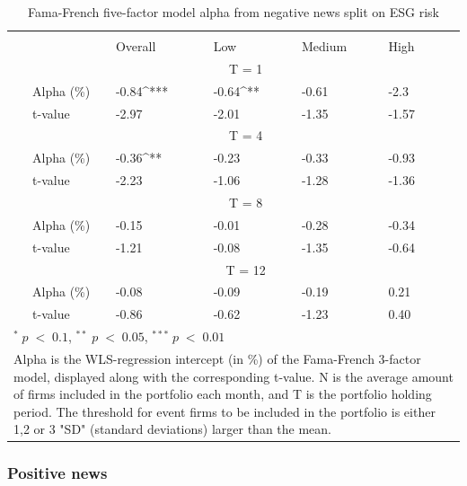 \setlength{\tabcolsep}{15pt}
\begin{table}[H]
\small
\centering
\caption{Fama-French five-factor model alpha from negative news split on ESG risk} 
\begin{tabular}{llllllc}
\hline \hline \\ 
 &     & Overall &    Low  &  Medium  &  High &  \\    \cline{3-6} 
& &  \multicolumn{3}{c}{ T = 1} & \\ \cline{2-6}
& Alpha (\%)    & -0.84^{***} & -0.64^{**}  & -0.61  & -2.3 &  \\ 
& t-value   & -2.97 & -2.01 & -1.35  & -1.57 &  \\
& &  \multicolumn{3}{c}{ T = 4} & \\ \cline{2-6}
& Alpha (\%)   & -0.36^{**} & -0.23  & -0.33  &  -0.93 & \\
& t-value &   -2.23 & -1.06 & -1.28  & -1.36 & \\
& &  \multicolumn{3}{c}{ T = 8} & \\ \cline{2-6}
& Alpha (\%)    & -0.15 & -0.01   & -0.28  & -0.34 &  \\
& t-value &   -1.21 & -0.08  & -1.35 & -0.64 &  \\
& &  \multicolumn{3}{c}{ T = 12} & \\ \cline{2-6}
& Alpha (\%)    & -0.08 & -0.09  & -0.19  & 0.21 &  \\
& t-value &    -0.86 & -0.62  & -1.23 & 0.40 &  \\
\hline \hline
 \multicolumn{7}{l}{ \footnotesize $^* \; p\; <\; 0.1$, $ ^{**} \; p\; <\; 0.05$, $ ^{***} \; p\; <\; 0.01$  } \\
 \multicolumn{7}{p{12cm}}{ \footnotesize Alpha is the WLS-regression intercept (in \%) of the Fama-French 3-factor model, displayed along with the corresponding t-value. N is the average amount of firms included in the portfolio each month, and T is the portfolio holding period. The threshold for event firms to be included in the portfolio is either 1,2 or 3 "SD" (standard deviations) larger than the mean.} \\ 
 \hline
\end{tabular}
\label{tab: FF5_neg_ESG}
\end{table}




\subsubsection{Positive news}

